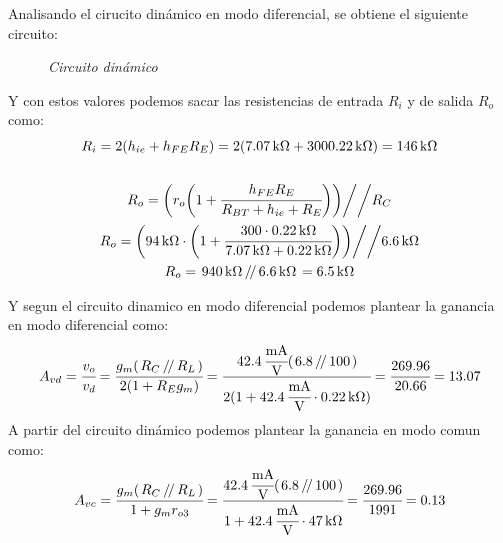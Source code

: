 \documentclass[a4paper,12pt]{article}
\newcommand{\parallelTwo}[2]{\left.#1\,\middle/\!\middle/\,#2\right.}
\newcommand{\mR}[1]{\SI{#1}{\kilo\ohm}}
\begin{document}
    \newpage
    Analisando el cirucito dinámico en modo diferencial, se obtiene el siguiente circuito:
    \begin{figure}[H]
        \setlength{\abovecaptionskip}{0pt}
		\centering
		\captionsetup{labelformat=empty}
		\caption{\small{\textit{ Circuito dinámico }}}
    \end{figure}

    Y con estos valores podemos sacar las resistencias de entrada $R_i$ y de salida $R_o$ como:
    \begin{gather*}
        R_i = 2 ( h_{ie} + h_{FE} R_E ) = 2 ( \mR{7.07} + 300 \mR{0.22} ) = \mR{146}
        \\ \\
        R_o = \bigg( r_o \bigg( 1 + \cfrac{h_{FE} R_E}{R_{BT} + h_{ie} + R_E} \bigg) \bigg) \bigg/\bigg/ R_C\\
        R_o = \bigg( \mR{94} \cdot \bigg( 1 + \cfrac{300 \cdot \mR{0.22}}{\mR{7.07} + \mR{0.22}} \bigg) \bigg) \bigg/\bigg/ \mR{6.6}\\
        R_o = \parallelTwo{\mR{940}}{\mR{6.6}} = \mR{6.5}
    \end{gather*}

    Y segun el circuito dinamico en modo diferencial podemos plantear la ganancia en modo diferencial como:
    \begin{gather*}
        A_{vd} = \cfrac{v_o}{v_d} = \cfrac{g_m (\parallelTwo{R_C}{R_L})}{2 (1 + R_E g_m)}
            = \cfrac{ \SI{42.4}{\cfrac{mA}{V}} (\parallelTwo{6.8}{100}) }{ 2 (1 + \SI{42.4}{\cfrac{mA}{V}} \cdot \mR{0.22}) }
            = \cfrac{269.96}{20.66} = 13.07
    \end{gather*}
    \newpage
    A partir del circuito dinámico podemos plantear la ganancia en modo comun como:
    \begin{gather*}
        A_{vc} = \cfrac{g_m (\parallelTwo{R_C}{R_L})}{1 + g_m r_{o3} }
            = \cfrac{ \SI{42.4}{\cfrac{mA}{V}} (\parallelTwo{6.8}{100}) }{ 1 + \SI{42.4}{\cfrac{mA}{V}} \cdot \mR{47} }
            = \cfrac{269.96}{1991} = 0.13
    \end{gather*}
\end{document}
